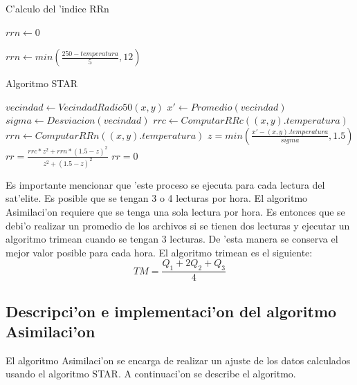   \begin{algorithm}
  \caption{C'alculo del 'indice RRn}

  \begin{algorithmic}
	  \STATE $rrn \gets 0$
  \ELSE
	  
	  \STATE $rrn \gets min(\frac{250-temperatura}{5}, 12)$ 
	  
  \ENDIF 
  \end{algorithmic}
  \end{algorithm}

  \begin{algorithm}
  \caption{Algoritmo STAR}

  \begin{algorithmic}
      \STATE $vecindad \gets VecindadRadio50(x,y)$
      \STATE $x' \gets Promedio(vecindad)$
      \STATE $sigma \gets Desviacion(vecindad)$  
      \STATE $rrc \gets ComputarRRc((x,y).temperatura)$
      \STATE $rrn \gets ComputarRRn((x,y).temperatura)$
      \STATE $z = min(\frac{ x'-(x,y).temperatura}{sigma}, 1.5)$
	\STATE $rr = \frac{rrc*z^2 + rrn*(1.5-z)^2}{z^2+ (1.5-z)^2}$
      \ELSE	  
	\STATE $rr = 0$   
      \ENDIF
    \ENDFOR
  \end{algorithmic}
  \end{algorithm}

Es importante mencionar que 'este proceso se ejecuta para cada lectura del sat'elite. Es posible que se tengan 3 o 4 lecturas por hora. El algoritmo 
Asimilaci'on requiere que se tenga una sola lectura por hora. Es entonces que se debi'o realizar un promedio de los archivos si se tienen dos lecturas y 
ejecutar un algoritmo trimean cuando se tengan 3 lecturas. De 'esta manera se conserva el mejor valor posible para cada hora.
El algoritmo trimean es el siguiente:
\begin{equation}
 TM=\frac{Q_1+2Q_2+Q_3}{4}
\end{equation} 

\subsection{Descripci'on e implementaci'on del algoritmo \\Asimilaci'on}

El algoritmo Asimilaci'on se encarga de realizar un ajuste de los
datos calculados usando el algoritmo STAR. A continuaci'on se
describe el algoritmo.

